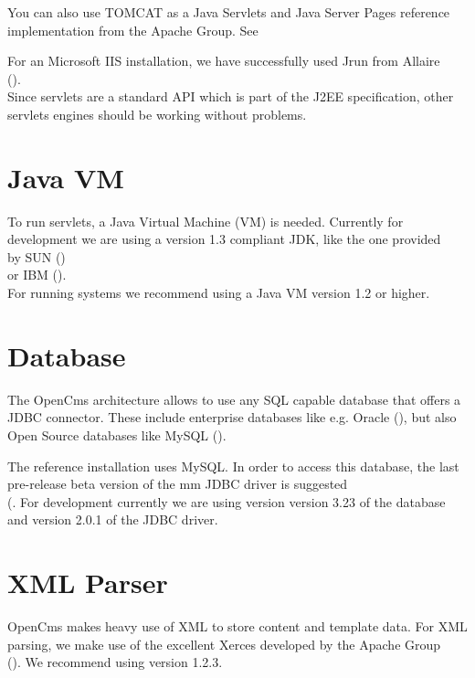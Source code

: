 You can also use TOMCAT as a Java Servlets and Java Server Pages 
reference implementation from the Apache Group. See 

For an Microsoft IIS installation, we have successfully used Jrun from Allaire \\
().\\ 
Since servlets are a standard API which is part of the J2EE specification, 
other servlets engines should be working without problems.

\section{Java VM}
To run servlets, a Java Virtual Machine (VM) is needed. Currently for development we are using 
a version 1.3 compliant JDK, like the one provided \\
by SUN ()\\
or IBM ().\\
For running systems we recommend using a Java VM version 1.2 or higher.

\section{Database}
The OpenCms architecture allows to use any SQL capable database that offers a JDBC connector. 
These include enterprise databases like e.g. Oracle (),
but also Open Source databases like MySQL ().  

The reference installation uses MySQL. In order to access this database, the last pre-release 
beta version of the mm JDBC driver is suggested\\
(. For 
development currently we are using version version 3.23 of the database and version 2.0.1 of the 
JDBC driver.
                            
\section{XML Parser}
OpenCms makes heavy use of XML to store content and template data. For XML parsing, we make use of 
the excellent Xerces developed by the Apache Group\\
().
We recommend using version 1.2.3. 

